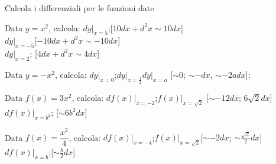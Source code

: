 \begin{esercizio}\label{ese:dif05}
Calcola i differenziali per le funzioni date
\begin{enumeratea}
  \item  Data \(y=x^2\), calcola:
  \(dy|_{x=5}\);\hfill [\(10dx+d^2x\sim 10dx\)]\\
  \(dy|_{x=-5}\)\hfill [\(-10dx+d^2x\sim -10 dx\)]\\
  \(dy|_{x=2}\); \hfill [\(4dx+d^2x\sim 4dx\)]
  \item Data \(y=-x^2\), calcola:
  \(dy|_{x=0}\);\hspace{3em}\(dy|_{x=\frac{1}{2}}\)\hspace{3em}\(dy|_{x=a}\)
  \hfill [\(\sim 0\); \(\sim -dx\), \(\sim -2adx\)];
  \item Data \(f(x)=3x^2\), calcola:
  \(df(x)|_{x=-2}\);\hspace{3em}\(f(x)|_{x=\sqrt{2}}\)
  \hfill [\(\sim -12dx\); \(6\sqrt{2}dx\)]\\
  \(df(x)|_{x=b^2}\); \hfill [\(\sim 6b^2dx\)]
  \item Data \(f(x)=\dfrac{x^2}{4}\), calcola:
  \(df(x)|_{x=-4}\);\hspace{3em}\(f(x)|_{x=\sqrt{2}}\)\hfill [\(\sim-2dx\); 
  \(\sim \frac{\sqrt{2}}{2}dx\)]\\
  \(df(x)|_{x=b}\);\hfill [\(\sim\frac{b}{2}dx\)]
 \end{enumeratea}
\end{esercizio}

